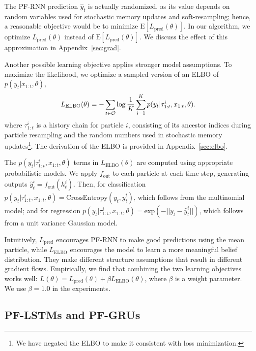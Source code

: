 \documentclass[letterpaper]{article} %
\begin{document}
The PF-RNN prediction  $\hat{y}_t$ is actually randomized, 
as its value depends on random variables used for stochastic memory updates and soft-resampling;
hence, a reasonable objective would be to minimize $\mathrm{E}[L_\mathrm{pred}(\theta)]$. In our algorithm, we optimize $L_\mathrm{pred}(\theta)$ instead of $\mathrm{E}[L_\mathrm{pred}(\theta)]$. We discuss the effect of this approximation in  Appendix~\ref{sec:grad}. 

Another possible learning objective applies stronger model assumptions. To maximize the likelihood, we optimize a sampled version of an ELBO of  $p(y_t|x_{1:t},\theta)$, 
\begin{equation}
	L_{\mathrm{ELBO}}(\theta) = - \sum_{t\in \cal{O}}\log \frac{1}{K} \sum\limits_{i=1}^K p(y_t | \tau_{1:t}^i, x_{1:t}, \theta).
\end{equation}
where $\tau^i_{1:t}$ is a history chain for particle $i$, consisting of its ancestor indices during particle resampling and the random numbers used in stochastic memory updates\footnote{We have negated the ELBO to make it consistent with loss minimization.}.  
The derivation of the ELBO 
is provided in Appendix~\ref{sec:elbo}. 

The $p(y_t | \tau_{1:t}^i, x_{1:t}, \theta)$ terms in $L_{\mathrm{ELBO}}(\theta)$ are computed using appropriate probabilistic models. We apply $f_\mathrm{out}$ to each particle at each time step, generating outputs $\hat{y}_t^i = f_\mathrm{out}(h_t^i)$. Then, for classification $p(y_t|\tau_{1:t}^i, x_{1:t}, \theta)=\mathrm{CrossEntropy}(y_t, \hat{y}_t^i)$, which follows from the multinomial model; 
and for regression $p(y_t | \tau_{1:t}^i, x_{1:t}, \theta) = \mathrm{exp}(-||y_t - \hat{y}_t^i||)$, which follows from a unit variance Gaussian model.

Intuitively, $L_\mathrm{pred}$ encourages PF-RNN to make good predictions using the mean particle,
while $L_{\mathrm{ELBO}}$
encourages the model to learn a more meaningful belief distribution. They make different structure assumptions that result in different gradient flows. Empirically, we find that combining the two learning objectives works well: $L(\theta) = L_\mathrm{pred}(\theta) + \beta L_{\mathrm{ELBO}}(\theta)$, where $\beta$ is a weight parameter. We use $\beta=1.0$ in the experiments. 

\subsection{PF-LSTMs and PF-GRUs}
\end{document}
